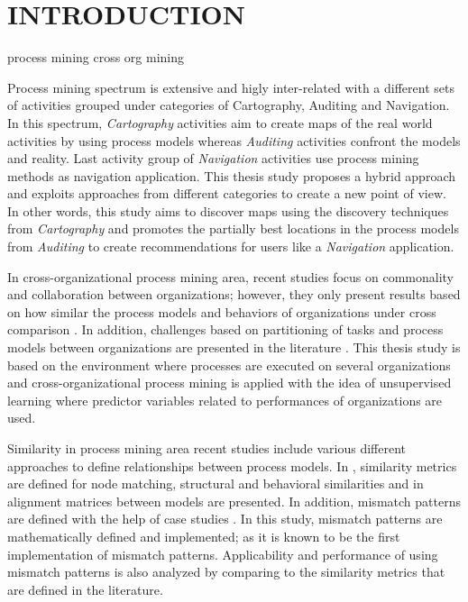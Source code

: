 \chapter{INTRODUCTION}
\label{chp:introduction}


process mining  
cross org mining 


Process mining spectrum is extensive and higly inter-related with a different sets of activities grouped under categories of Cartography, Auditing and Navigation. In this spectrum, \textit{Cartography} activities aim to create maps of the real world activities by using process models whereas \textit{Auditing} activities confront the models and reality. Last activity group of \textit{Navigation} activities use process mining methods as navigation application. This thesis study proposes a hybrid approach and exploits approaches from different categories to create a new point of view. In other words, this study aims to discover maps using the discovery techniques from \textit{Cartography} and promotes the partially best locations in the process models from \textit{Auditing} to create recommendations for users like a \textit{Navigation} application. 

In cross-organizational process mining area, recent studies focus on commonality and collaboration between organizations; however, they only present results based on how similar the process models and behaviors of organizations under cross comparison \cite{buijs2012towards}. In addition, challenges based on partitioning of tasks and process models between organizations are presented in the literature \cite{van2011intra}. This thesis study is based on the environment where processes are executed on several organizations and cross-organizational process mining is applied with the idea of unsupervised learning where predictor variables related to performances of organizations are used.

Similarity in process mining area recent studies include various different approaches to define relationships between process models. In \cite{dijkman2011similarity}, similarity metrics are defined for node matching, structural and behavioral similarities and in \cite{buijs2014comparing} alignment matrices between models are presented. In addition, mismatch patterns are defined with the help of case studies \cite{dijkman2007mismatch}. In this study, mismatch patterns are mathematically defined and implemented; as it is known to be the first implementation of mismatch patterns. Applicability and performance of using mismatch patterns is also analyzed by comparing to the similarity metrics that are defined in the literature. 

